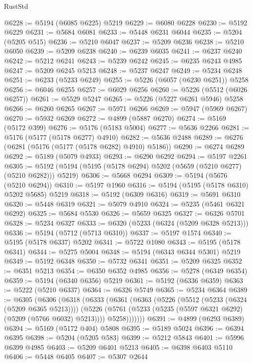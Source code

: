 \begin{lexlean}{RustStd}
\begin{coremodule}
@6228 := @5194 (@6085 @6225) @5219
@6229 := @6080 @6228
@6230 := @5192 @6229
@6231 := @5684 @6081
@6233 := @5448 @6231 @6044
@6235 := @5204 (@5205 @515)
@6236 := @5210 @6047
@6237 := @5209 @6236
@6238 := @5210 @6050
@6239 := @5209 @6238
@6240 := @6239 @6035
@6241 := @6237 @6240
@6242 := @5212 @6241
@6243 := @5239 @6242
@6245 := @6235 @6243 @4985
@6247 := @5209 @6245 @5213
@6248 := @5237 @6247
@6249 := @5234 @6248
@6251 := @6233 (@5233 @6249)
@6255 := @5226 (@6057 (@6230 @6251)) @5258
@6256 := @6046 @6255
@6257 := @6029 @6256
@6260 := @5226 (@5512 (@6026 @6257))
@6261 := @5529 @5247
@6265 := @5226 (@5227 @6261 @5946) @5258
@6266 := @6260 @6265
@6267 := @5971 @6266
@6269 := @5947 (@5969 @6267)
@6270 := @5932 @6269
@6272 := @4899 (@5887 @6270)
@6274 := @5169 (@5172 @399)
@6276 := @5176 (@5183 @5004)
@6277 := @5636 @2266
@6281 := @5176 (@5177 (@5178 @6277) @4910)
@6282 := @5636 @2488
@6289 := @6276 (@6281 (@5176 (@5177 (@5178 @6282) @4910) @5186))
@6290 := @6274 @6289
@6292 := @5189 (@5079 @4933)
@6293 := @6290 @6292
@6294 := @5197 @2261
@6305 := @5192 (@5194 (@5195 (@5178 @6294) @5202 (@5659 (@5210 @6277) (@5210 @6282))) @5219)
@6306 := @5668 @6294
@6309 := @5194 (@5676 (@5210 @6294))
@6310 := @5197 @1960
@6316 := @5194 (@5195 (@5178 @6310) @5202 @5685) @5219
@6318 := @5192 (@6309 @6316)
@6319 := @5691 @6310
@6320 := @5448 @6319
@6321 := @5079 @4910
@6324 := @5235 (@5461 @6321 @6292)
@6325 := @5684 @5530
@6326 := @5659 @6325
@6327 := @6326 @5701
@6328 := @5234 @6327
@6333 := @6320 (@5233 (@6324 (@5209 @6328 @5213)))
@6336 := @5194 (@5712 (@5713 @6310))
@6337 := @5197 @1574
@6340 := @5195 (@5178 @6337) @5202
@6341 := @5722 @1080
@6343 := @5195 (@5178 @6341)
@6344 := @5275 @5004
@6348 := @5194 (@6343 @6344 @5301) @5219
@6349 := @5192 @6348
@6350 := @5732 @6341
@6351 := @5209 @6325
@6352 := @6351 @5213
@6354 := @6350 @6352 @4985
@6356 := @5278 (@6349 @6354)
@6359 := @5194 (@6340 @6356) @5219
@6361 := @5192 (@6336 @6359)
@6363 := @5222 (@5210 @6337)
@6364 := @6326 @5749
@6365 := @5234 @6364
@6389 := @6305
    (@6306
      (@6318
        (@6333
          (@6361
            (@6363
              (@5226
                (@5512 (@5233 (@6324 (@5209 @6365 @5213))))
                (@5226
                  (@5761 (@5233 (@5235 (@5597 @6321 @6292) (@5209 (@5766 @6032) @5213))))
                  @5258)))))))
@6391 := @4899 (@6293 @6389)
@6394 := @5169 (@5172 @404) @5808
@6395 := @5189 @5024
@6396 := @6394 @6395
@6398 := @5204 (@5205 @583)
@6399 := @5212 @5843
@6401 := @5996 @6399 @4985
@6403 := @5209 @6401 @5213
@6405 := @6398 @6403 @5110
@6406 := @5448 @6405
@6407 := @5307 @2644

\end{coremodule}
\end{lexlean}
